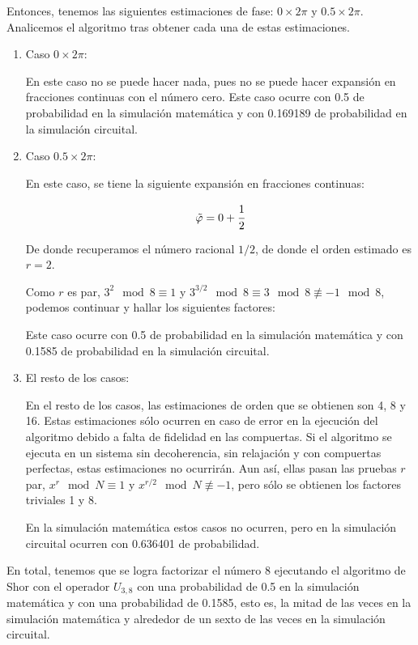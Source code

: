 Entonces, tenemos las siguientes estimaciones de fase: $0 \times 2\pi$ y $0.5 \times 2\pi$. Analicemos el algoritmo tras obtener cada una de estas estimaciones.

\begin{enumerate}
    \item Caso $0 \times 2\pi$:

        En este caso no se puede hacer nada, pues no se puede hacer expansión en fracciones continuas con el número cero. Este caso ocurre con 0.5 de probabilidad en la simulación matemática y con 0.169189 de probabilidad en la simulación circuital.

    \item Caso $0.5 \times 2\pi$:

        En este caso, se tiene la siguiente expansión en fracciones continuas:

        \begin{equation}
            \tilde{\varphi} = 0 + \cfrac{1}{2}
        \end{equation}
        
        De donde recuperamos el número racional $1/2$, de donde el orden estimado es $r = 2$.

        Como $r$ es par, $3^{2}\mod 8 \equiv 1$ y $3^{3/2}\mod 8 \equiv 3\mod 8 \not\equiv -1\mod 8$, podemos continuar y hallar los siguientes factores:

        Este caso ocurre con 0.5 de probabilidad en la simulación matemática y con 0.1585 de probabilidad en la simulación circuital.

    \item El resto de los casos:

        En el resto de los casos, las estimaciones de orden que se obtienen son 4, 8 y 16. Estas estimaciones sólo ocurren en caso de error en la ejecución del algoritmo debido a falta de fidelidad en las compuertas. Si el algoritmo se ejecuta en un sistema sin decoherencia, sin relajación y con compuertas perfectas, estas estimaciones no ocurrirán. Aun así, ellas pasan las pruebas $r$ par, $x^r \mod N \equiv 1$ y $x^{r/2} \mod N \not\equiv -1$, pero sólo se obtienen los factores triviales 1 y 8.

        En la simulación matemática estos casos no ocurren, pero en la simulación circuital ocurren con 0.636401 de probabilidad.
\end{enumerate}

En total, tenemos que se logra factorizar el número 8 ejecutando el algoritmo de Shor con el operador $U_{3,8}$ con una probabilidad de 0.5 en la simulación matemática y con una probabilidad de 0.1585, esto es, la mitad de las veces en la simulación matemática y alrededor de un sexto de las veces en la simulación circuital.

